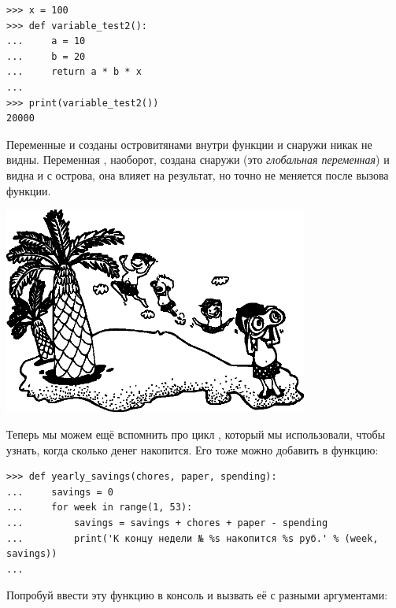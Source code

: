 \begin{listing}
\begin{verbatim}
>>> x = 100
>>> def variable_test2():
...     a = 10
...     b = 20
...     return a * b * x
... 
>>> print(variable_test2())
20000
\end{verbatim}
\end{listing}

Переменные  и  созданы островитянами внутри функции и снаружи никак не видны. Переменная , наоборот, создана снаружи (это \emph{глобальная переменная}) и видна и с острова, она влияет на результат, но точно не меняется после вызова функции.

\begin{center}
\includegraphics*[width=100mm]{../en/islanders.eps}
\end{center}

Теперь мы можем ещё вспомнить про цикл , который мы использовали, чтобы узнать, когда сколько денег накопится. Его тоже можно добавить в функцию:

\begin{listing}
\begin{verbatim}
>>> def yearly_savings(chores, paper, spending):
...     savings = 0
...     for week in range(1, 53):
...         savings = savings + chores + paper - spending
...         print('К концу недели № %s накопится %s руб.' % (week, savings))
...
\end{verbatim}
\end{listing}

Попробуй ввести эту функцию в консоль и вызвать её с разными аргументами:

